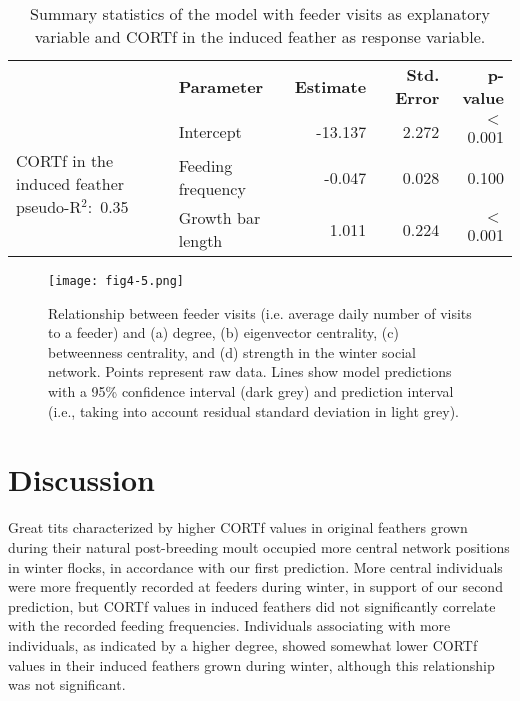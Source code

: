 \documentclass[10pt, twoside]{book} %
\begin{document}
\begin{table}[h!]
	\begin{center}
		\begin{footnotesize}
			\caption{Summary statistics of the model with feeder visits as explanatory variable and CORTf in the induced feather as response variable.} \label{tab4-4} 
			
			\begingroup
			\setlength{\tabcolsep}{8pt} %
			\renewcommand{\arraystretch}{1.5} %
			\begin{tabular}{p{2cm} l r r r}
				
				\toprule
				& \textbf{Parameter} & \textbf{Estimate} & \textbf{Std. Error} &\textbf{p-value}\\
				\cmidrule{2-5}
				\multirow{3}{2cm}{CORTf in the induced feather \mbox{pseudo-R$^2$: 0.35}} & Intercept & -13.137 & 2.272 & $<$ 0.001\\
				& Feeding frequency & -0.047 & 0.028 & 0.100\\
				& Growth bar length &1.011 & 0.224 & $<$ 0.001\\
				\bottomrule
			\end{tabular}\endgroup
		\end{footnotesize}
	\end{center}
\end{table}

\begin{figure}[h!]
	\begin{center}
		\texttt{[image: fig4-5.png]}
	\end{center}
	\caption{Relationship between feeder visits (i.e. average daily number of visits to a feeder) and (a) degree, (b) eigenvector centrality, (c) betweenness centrality, and (d) strength in the winter social network. Points represent raw data. Lines show model predictions with a 95\% confidence interval (dark grey) and prediction interval (i.e., taking into account residual standard deviation in light grey).}\label{fig4-5}
\end{figure}


\clearpage	
	\section{Discussion}
	
Great tits characterized by higher CORTf values in original feathers grown during their natural post-breeding moult occupied more central network positions in winter flocks, in accordance with our first prediction. More central individuals were more frequently recorded at feeders during winter, in support of our second prediction, but CORTf values in induced feathers did not significantly correlate with the recorded feeding frequencies. Individuals associating with more individuals, as indicated by a higher degree, showed somewhat lower CORTf values in their induced feathers grown during winter, although this relationship was not significant.\\
\end{document}
